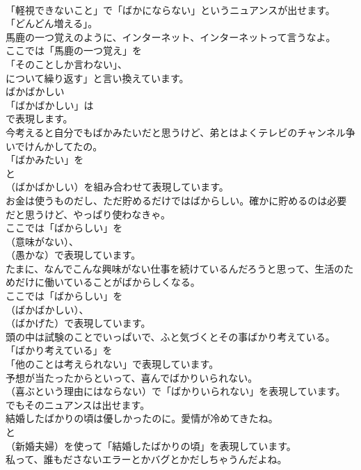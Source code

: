 \documentclass[8pt]{extreport}
\begin{document}
\begin{CJK}{UTF8}{min}
\\	「軽視できないこと」で「ばかにならない」というニュアンスが出せます。
\\	「どんどん増える」。	
\\	馬鹿の一つ覚えのように、インターネット、インターネットって言うなよ。 
\\	ここでは「馬鹿の一つ覚え」を
\\	「そのことしか言わない」、
\\	について繰り返す」と言い換えています。	
\\	ばかばかしい 
\\	「ばかばかしい」は
\\	で表現します。	
\\	今考えると自分でもばかみたいだと思うけど、弟とはよくテレビのチャンネル争いでけんかしてたの。 
\\	「ばかみたい」を 
\\	と 
\\	（ばかばかしい）を組み合わせて表現しています。	
\\	お金は使うものだし、ただ貯めるだけではばからしい。確かに貯めるのは必要だと思うけど、やっぱり使わなきゃ。 
\\	ここでは「ばからしい」を
\\	（意味がない）、
\\	（愚かな）で表現しています。	
\\	たまに、なんでこんな興味がない仕事を続けているんだろうと思って、生活のためだけに働いていることがばからしくなる。 
\\	ここでは「ばからしい」を 
\\	（ばかばかしい）、
\\	（ばかげた）で表現しています。	
\\	頭の中は試験のことでいっぱいで、ふと気づくとその事ばかり考えている。 
\\	「ばかり考えている」を
\\	「他のことは考えられない」で表現しています。	
\\	予想が当たったからといって、喜んでばかりいられない。 
\\	（喜ぶという理由にはならない）で「ばかりいられない」を表現しています。
\\	でもそのニュアンスは出せます。	
\\	結婚したばかりの頃は優しかったのに。愛情が冷めてきたね。 
\\	と 
\\	（新婚夫婦）を使って「結婚したばかりの頃」を表現しています。	
\\	私って、誰もださないエラーとかバグとかだしちゃうんだよね。 

\end{CJK}
\end{document}
